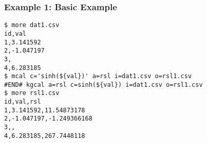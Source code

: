 \subsubsection*{Example 1: Basic Example}



\begin{Verbatim}[baselinestretch=0.7,frame=single]
$ more dat1.csv
id,val
1,3.141592
2,-1.047197
3,
4,6.283185
$ mcal c='sinh(${val})' a=rsl i=dat1.csv o=rsl1.csv
#END# kgcal a=rsl c=sinh(${val}) i=dat1.csv o=rsl1.csv
$ more rsl1.csv
id,val,rsl
1,3.141592,11.54873178
2,-1.047197,-1.249366168
3,,
4,6.283185,267.7448118
\end{Verbatim}
